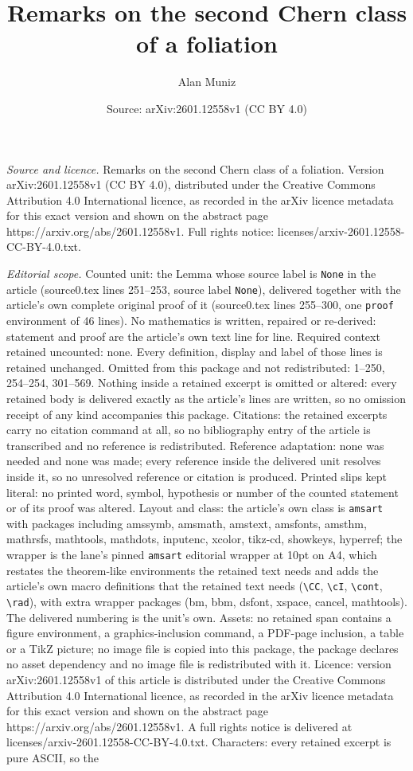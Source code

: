 \documentclass[10pt,a4paper]{amsart}
\title[Remarks on the second Chern class of a foliation]{Remarks on the second Chern class of a foliation}
\author{Alan Muniz}
\date{Source: arXiv:2601.12558v1 (CC BY 4.0)}
\begin{document}
\maketitle

\noindent\emph{Source and licence.} Remarks on the second Chern class of a foliation. Version arXiv:2601.12558v1 (CC BY 4.0), distributed under the Creative Commons Attribution 4.0 International licence, as recorded in the arXiv licence metadata for this exact version and shown on the abstract page https://arxiv.org/abs/2601.12558v1. Full rights notice: licenses/arxiv-2601.12558-CC-BY-4.0.txt.\par\smallskip

\noindent\textit{Editorial scope.} Counted unit: the Lemma whose source label is \texttt{None} in the article (source0.tex lines 251--253, source label \texttt{None}), delivered together with the article's own complete original proof of it (source0.tex lines 255--300, one \texttt{proof} environment of 46 lines). No mathematics is written, repaired or re-derived: statement and proof are the article's own text line for line. Required context retained uncounted: none. Every definition, display and label of those lines is retained unchanged. Omitted from this package and not redistributed: 1--250, 254--254, 301--569. Nothing inside a retained excerpt is omitted or altered: every retained body is delivered exactly as the article's lines are written, so no omission receipt of any kind accompanies this package. Citations: the retained excerpts carry no citation command at all, so no bibliography entry of the article is transcribed and no reference is redistributed. Reference adaptation: none was needed and none was made; every reference inside the delivered unit resolves inside it, so no unresolved reference or citation is produced. Printed slips kept literal: no printed word, symbol, hypothesis or number of the counted statement or of its proof was altered. Layout and class: the article's own class is \texttt{amsart} with packages including amssymb, amsmath, amstext, amsfonts, amsthm, mathrsfs, mathtools, mathdots, inputenc, xcolor, tikz-cd, showkeys, hyperref; the wrapper is the lane's pinned \texttt{amsart} editorial wrapper at 10pt on A4, which restates the theorem-like environments the retained text needs and adds the article's own macro definitions that the retained text needs (\texttt{\textbackslash CC}, \texttt{\textbackslash cI}, \texttt{\textbackslash cont}, \texttt{\textbackslash rad}), with extra wrapper packages (bm, bbm, dsfont, xspace, cancel, mathtools). The delivered numbering is the unit's own. Assets: no retained span contains a figure environment, a graphics-inclusion command, a PDF-page inclusion, a table or a TikZ picture; no image file is copied into this package, the package declares no asset dependency and no image file is redistributed with it. Licence: version arXiv:2601.12558v1 of this article is distributed under the Creative Commons Attribution 4.0 International licence, as recorded in the arXiv licence metadata for this exact version and shown on the abstract page https://arxiv.org/abs/2601.12558v1. A full rights notice is delivered at licenses/arxiv-2601.12558-CC-BY-4.0.txt. Characters: every retained excerpt is pure ASCII, so the 
\end{document}
